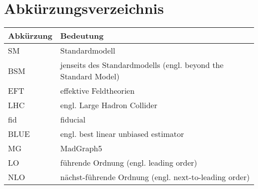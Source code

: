\chapter{Abkürzungsverzeichnis}
\begin{table}[H]
    \centering
   \begin{tabular}{ll}
     Abkürzung & Bedeutung\\
     \midrule
     SM & Standardmodell\\
     BSM & jenseits des Standardmodells (engl. beyond the Standard Model)\\
     EFT & effektive Feldtheorien\\
     LHC & engl. Large Hadron Collider\\
     fid & fiducial\\
     BLUE & engl. best linear unbiased estimator\\
     MG & MadGraph5\\
     LO & führende Ordnung (engl. leading order)\\
     NLO & nächst-führende Ordnung (engl. next-to-leading order)\\
   \end{tabular}
\end{table}
